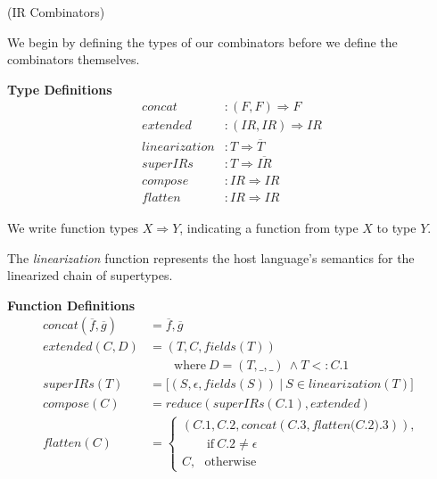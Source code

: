 \documentclass[preprint,10pt]{sigplanconf}
\theoremstyle{definition}
\theoremstyle{definition}
\begin{document}
\begin{defn}{(IR Combinators)}

We begin by defining the types of our combinators before we define the
combinators themselves.

\vspace{0.2cm}
{\bf Type Definitions}
{\small
\begin{align*}
\textit{concat}&        : (F, F) \Rightarrow F\\
\textit{extended}&      : (IR, IR) \Rightarrow IR\\
\textit{linearization}& : T \Rightarrow \overline{T}\\
\textit{superIRs}&      : T \Rightarrow \overline{IR}\\
\textit{compose}&       : IR \Rightarrow IR\\
\textit{flatten}&       : IR \Rightarrow IR
\end{align*}
}%

We write function types $X \Rightarrow Y$, indicating a function from type $X$
to type $Y$.

The \textit{linearization} function represents the host language's semantics for the
linearized chain of supertypes.\footnotemark[1]

\vspace{0.3cm}

{\bf Function Definitions}
{\small
\begin{align*}
\textit{concat}(\overline{f}, \overline{g})& = \overline{f}, \overline{g}\\
\textit{extended}(C, D)&                     = (T, C, \textit{fields}(T))\\
                       &                       \qquad \mbox{where}~D = (T, \_, \_)~\land T <: C.1\\
\textit{superIRs}(T)&                        = \lbrack(S, \epsilon, \textit{fields}(S))~|~S\in \textit{linearization}(T)\rbrack\\
\textit{compose}(C)&                         = \textit{reduce}(\textit{superIRs}(C.1),\textit{extended})\\
\textit{flatten}(C)&                         =\left\{ \begin{array}{l}
                                                (C.1, C.2, \textit{concat}(C.3, \textit{flatten(C.2).3})),\\
                                                \qquad\mbox{if}~C.2\neq\epsilon\\
                                                C,~~~\mbox{otherwise}
                                              \end{array} \right.
\end{align*}
}%



\end{defn}
\end{document}
